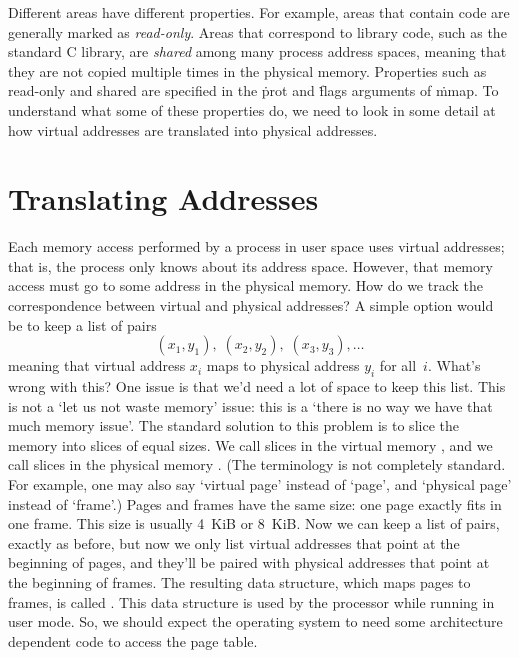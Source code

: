 \smallskip

Different areas have different properties.
For example, areas that contain code are generally marked as \emph{read-only}.
Areas that correspond to library code,
  such as the standard C library,
  are \emph{shared} among many process address spaces,
    meaning that they are not copied multiple times in the physical memory.
Properties such as read-only and shared are specified
  in the \.{prot} and \.{flags} arguments of \.{mmap}.
To understand what some of these properties do,
  we need to look in some detail at how virtual addresses
  are translated into physical addresses.

\section*{Translating Addresses}


Each memory access performed by a process in user space uses virtual addresses;
  that is, the process only knows about its address space.
However, that memory access must go to some address in the physical memory.
How do we track the correspondence between virtual and physical addresses?
A simple option would be to keep a list of pairs
\[
  (x_1,y_1),\; (x_2,y_2),\; (x_3,y_3), \ldots
\]
meaning that virtual address $x_i$ maps to physical address $y_i$ for all~$i$.
What's wrong with this?
One issue is that we'd need a lot of space to keep this list.
This is not a `let us not waste memory' issue:
  this is a `there is no way we have that much memory issue'.
The standard solution to this problem
  is to slice the memory into slices of equal sizes.
We call slices in the virtual memory ,
  and we call slices in the physical memory .
(The terminology is not completely standard.
  For example, one may also say `virtual page' instead of `page',
    and `physical page' instead of `frame'.)
Pages and frames have the same size: one page exactly fits in one frame.
This size is usually 4~KiB or 8~KiB\null.
Now we can keep a list of pairs, exactly as before,
  but now we only list virtual addresses that point at the beginning of pages,
  and they'll be paired with physical addresses that point at the beginning of frames.
The resulting data structure, which maps pages to frames,
  is called .
This data structure is used by the processor while running in user mode.
So, we should expect the operating system to need some architecture dependent
  code to access the page table.

